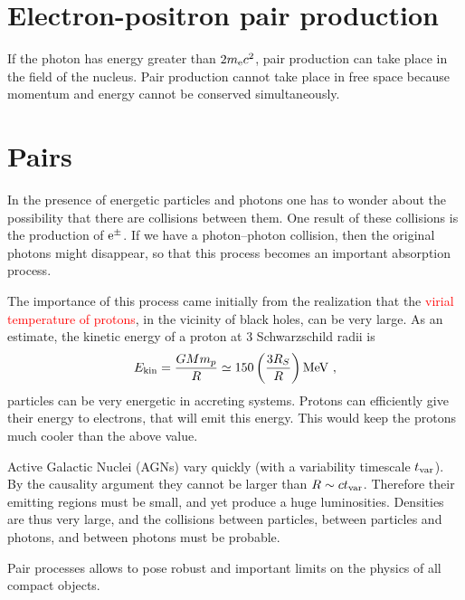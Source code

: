 \documentclass[12pt,a4paper]{article}
\begin{document}
\section{Electron-positron pair production}
\cite{2011hea..book.....L} If the photon has energy greater than $2 m_{\rm e} c^2$, pair production can take place in the field of the nucleus. Pair production cannot take place in free space because momentum and energy cannot be conserved simultaneously. 

\section{Pairs}
\cite{2013LNP...873.....G} In the presence of energetic particles and photons one has to wonder about the possibility that there are collisions between them. One result of these collisions is the production of $\rm e^\pm$. If we have a photon–photon collision, then the original photons might disappear, so that this process becomes an important absorption process.

The importance of this process came initially from the realization that the \textcolor{red}{virial temperature of protons}, in the vicinity of black holes, can be very large. As an estimate, the kinetic energy of a proton at $3$ Schwarzschild radii is
\begin{align}
E_{\rm kin} = \dfrac{GM m_p}{R} \simeq 150 \left(\dfrac{3R_S}{R} \right) \rm MeV ~,
\end{align}
particles can be very energetic in accreting systems. Protons can efficiently give their energy to electrons, that will emit this energy. This would keep the protons much cooler than the above value.

Active Galactic Nuclei (AGNs) vary quickly (with a variability timescale $t_{\rm var}$). By the causality argument they cannot be larger than $R \sim ct_{\rm var}$. Therefore their emitting regions must be small, and yet produce a huge luminosities. Densities are thus very large, and the collisions between particles, between particles and photons, and between photons must be probable. 

Pair processes allows to pose robust and important limits on the physics of all compact objects.
\end{document}
